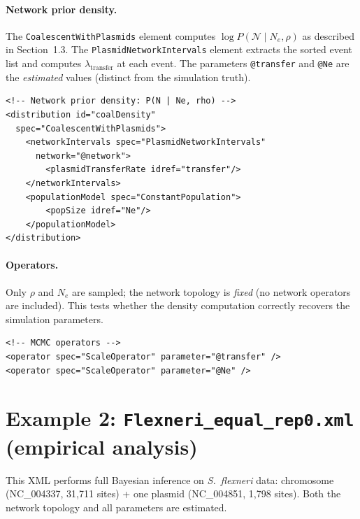 \documentclass[11pt]{article}
\begin{document}
\bigskip
\noindent\begin{minipage}{\linewidth}
\paragraph{Network prior density.}
The \texttt{CoalescentWithPlasmids} element computes $\log P(\mathcal{N} \mid N_e, \rho)$ as described in Section~1.3.
The \texttt{PlasmidNetworkIntervals} element extracts the sorted event list and computes $\lambda_{\text{transfer}}$ at each event.
The parameters \texttt{@transfer} and \texttt{@Ne} are the \emph{estimated} values (distinct from the simulation truth).
\begin{lstlisting}
<!-- Network prior density: P(N | Ne, rho) -->
<distribution id="coalDensity"
  spec="CoalescentWithPlasmids">
    <networkIntervals spec="PlasmidNetworkIntervals"
      network="@network">
        <plasmidTransferRate idref="transfer"/>
    </networkIntervals>
    <populationModel spec="ConstantPopulation">
        <popSize idref="Ne"/>
    </populationModel>
</distribution>
\end{lstlisting}
\end{minipage}

\bigskip
\noindent\begin{minipage}{\linewidth}
\paragraph{Operators.}
Only $\rho$ and $N_e$ are sampled; the network topology is \emph{fixed} (no network operators are included). This tests whether the density computation correctly recovers the simulation parameters.
\begin{lstlisting}
<!-- MCMC operators -->
<operator spec="ScaleOperator" parameter="@transfer" />
<operator spec="ScaleOperator" parameter="@Ne" />
\end{lstlisting}
\end{minipage}

\section{Example 2: \texttt{Flexneri\_equal\_rep0.xml} (empirical analysis)}

This XML performs full Bayesian inference on \textit{S.~flexneri} data: chromosome (NC\_004337, 31,711 sites) + one plasmid (NC\_004851, 1,798 sites). Both the network topology and all parameters are estimated.
\end{document}
